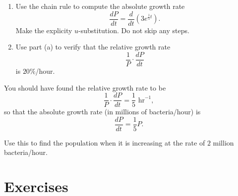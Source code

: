 \documentclass{ximera}
\begin{document}
\begin{example}
\begin{explanation}
\begin{question}  \label{QODEERER}
\begin{enumerate}
\item Use the chain rule to compute the absolute growth rate
\[
\frac{dP}{dt} = \frac{d}{dt} \left(   3e^{\frac{1}{5}t}\right) .
\]
Make the explicity $u$-substitution. Do not skip any steps.

\item Use part (a) to verify that the relative growth rate 
\[
  \frac{1}{P} \cdot \frac{dP}{dt} 
\]
is $20\%$/hour.
\end{enumerate}

\end{question}

You should have found the relative growth rate to be
\[
   \frac{1}{P} \cdot \frac{dP}{dt} = \frac{1}{5}\text{ hr}^{-1} ,
\]
so that the absolute growth rate (in millions of bacteria/hour) is
\[
 \frac{dP}{dt} = \frac{1}{5}P .
\]

\begin{question} \label{QERdfsdf}
Use this to find the population when it is increasing at the rate of $2$ million bacteria/hour.
\end{question}

\end{explanation}

\end{example}


\section{Exercises}
\end{document}
